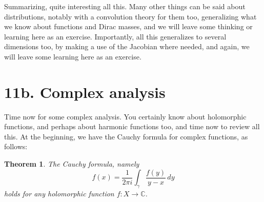 \documentclass[12pt]{amsbook}
\newtheorem{theorem}{Theorem}[chapter]
\begin{document}
Summarizing, quite interesting all this. Many other things can be said about distributions, notably with a convolution theory for them too, generalizing what we know about functions and Dirac masses, and we will leave some thinking or learning here as an exercise. Importantly, all this generalizes to several dimensions too, by making a use of the Jacobian where needed, and again, we will leave some learning here as an exercise.

\section*{11b. Complex analysis} 

Time now for some complex analysis. You certainly know about holomorphic functions, and perhaps about harmonic functions too, and time now to review all this. At the beginning, we have the Cauchy formula for complex functions, as follows:

\begin{theorem}
The Cauchy formula, namely
$$f(x)=\frac{1}{2\pi i}\int_\gamma\frac{f(y)}{y-x}\,dy$$
holds for any holomorphic function $f:X\to\mathbb C$.
\end{theorem}
\end{document}
